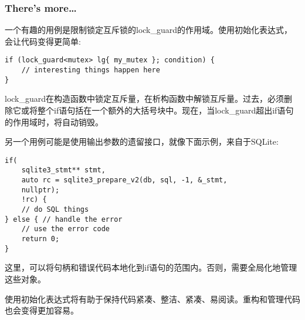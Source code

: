 \subsubsection{There's more…}

一个有趣的用例是限制锁定互斥锁的lock\_guard的作用域。使用初始化表达式，会让代码变得更简单:

\begin{lstlisting}[style=styleCXX]
if (lock_guard<mutex> lg{ my_mutex }; condition) {
	// interesting things happen here
}
\end{lstlisting}

lock\_guard在构造函数中锁定互斥量，在析构函数中解锁互斥量。过去，必须删除它或将整个if语句括在一个额外的大括号块中。现在，当lock\_guard超出if语句的作用域时，将自动销毁。

另一个用例可能是使用输出参数的遗留接口，就像下面示例，来自于SQLite:

\begin{lstlisting}[style=styleCXX]
if(
	sqlite3_stmt** stmt,
	auto rc = sqlite3_prepare_v2(db, sql, -1, &_stmt,
	nullptr);
	!rc) {
	// do SQL things
} else { // handle the error
	// use the error code
	return 0;
}
\end{lstlisting}

这里，可以将句柄和错误代码本地化到if语句的范围内。否则，需要全局化地管理这些对象。

使用初始化表达式将有助于保持代码紧凑、整洁、紧凑、易阅读。重构和管理代码也会变得更加容易。













